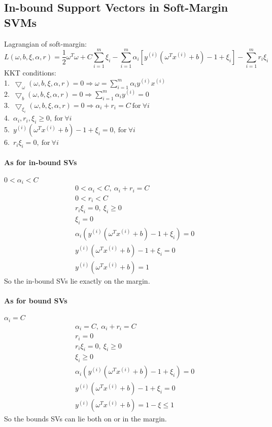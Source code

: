 \documentclass[UTF8]{article}
\begin{document}
\subsection{In-bound Support Vectors in Soft-Margin SVMs}
\noindent Lagrangian of soft-margin:
$$
L(\omega,b,\xi,\alpha,r) = \frac{1}{2}\omega^T\omega + C\sum_{i=1}^m\xi_i - \sum_{i=1}^m\alpha_i[y^{(i)}(\omega^Tx^{(i)}+b)-1+\xi_i] - \sum_{i=1}^m r_i \xi_i
$$
KKT conditions:\\
1.\ $\bigtriangledown_{\omega}(\omega,b,\xi,\alpha,r) = 0 \Rightarrow \omega = \sum_{i=1}^m\alpha_i y^{(i)}x^{(i)}$ \\
2.\ $\bigtriangledown_b(\omega,b,\xi,\alpha,r) = 0 \Rightarrow \sum_{i=1}^m \alpha_iy^{(i)}=0$ \\
3.\ $\bigtriangledown_\xi_i(\omega,b,\xi,\alpha,r) = 0 \Rightarrow \alpha_i + r_i = C \ \text{for} \ \forall i$ \\
4.\ $\alpha_i,r_i,\xi_i \geq 0, \ \text{for} \ \forall i$\\
5.\ $y^{(i)}(\omega^Tx^{(i)}+b)-1+\xi_i=0,\ \text{for} \ \forall i$ \\
6.\ $r_i\xi_i=0, \ \text{for} \ \forall i$
\paragraph{As for in-bound SVs}
$0 < \alpha_i < C$
\begin{align*}
  &0 < \alpha_i < C,\ \alpha_i + r_i = C \\
  &0 < r_i < C \\
  &r_i\xi_i = 0,\ \xi_i \geq 0 \\
  &\xi_i = 0\\
  &\alpha_i(y^{(i)}(\omega^Tx^{(i)}+b)-1+\xi_i) = 0\\
  & y^{(i)}(\omega^Tx^{(i)}+b)-1+\xi_i = 0\\
  &y^{(i)}(\omega^Tx^{(i)}+b) = 1
\end{align*}
So the in-bound  SVs lie exactly on the margin.
\paragraph{As for bound SVs}
$\alpha_i = C$
\begin{align*}
  &\alpha_i = C,\ \alpha_i + r_i = C \\
  &r_i = 0 \\
  &r_i\xi_i = 0,\ \xi_i \geq 0 \\
  &\xi_i \geq 0\\
  &\alpha_i(y^{(i)}(\omega^Tx^{(i)}+b)-1+\xi_i) = 0\\
  & y^{(i)}(\omega^Tx^{(i)}+b)-1+\xi_i = 0\\
  &y^{(i)}(\omega^Tx^{(i)}+b) = 1 - \xi \leq 1
\end{align*}
So the bounds SVs can lie both on or in the margin.
\end{document}
